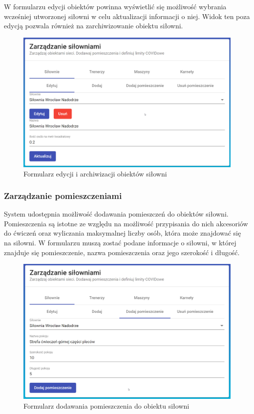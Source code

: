 \documentclass[a4paper,twoside,12pt]{book}
\begin{document}
\newpage
W formularzu edycji obiektów powinna wyświetlić się możliwość wybrania wcześniej utworzonej siłowni w celu aktualizacji informacji o niej. Widok ten poza edycją pozwala również na zarchiwizowanie obiektu siłowni.
\begin{figure}[h!]
	\centering
	\includegraphics[width=1\linewidth]{../zrzuty_ekranu/dzialanie/obiekty/edycja}
	\caption{Formularz edycji i archiwizacji obiektów siłowni}
	\label{fig:edycja}
\end{figure}
\FloatBarrier


\subsubsection{Zarządzanie pomieszczeniami}
System udostępnia możliwość dodawania pomieszczeń do obiektów siłowni. Pomieszczenia są istotne ze względu na możliwość przypisania do nich akcesoriów do ćwiczeń oraz wyliczania maksymalnej liczby osób, która może znajdować się na siłowni. W formularzu muszą zostać podane informacje o siłowni, w której znajduje się pomieszczenie, nazwa pomieszczenia oraz jego szerokość i długość.
\begin{figure}[h!]
	\centering
	\includegraphics[width=1\linewidth]{../zrzuty_ekranu/dzialanie/pomieszczenia/dodawanie}
	\caption{Formularz dodawania pomieszczenia do obiektu siłowni}
	\label{fig:dodawanie_pomieszczenia}
\end{figure}
\FloatBarrier
\end{document}
